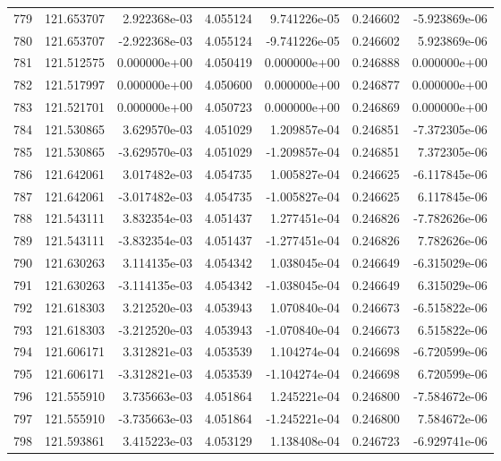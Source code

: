 \begin{tabular}{rrrrrrr}
 779 & 121.653707 &  2.922368e-03 &  4.055124 &  9.741226e-05 &   0.246602 & -5.923869e-06 \\
 780 & 121.653707 & -2.922368e-03 &  4.055124 & -9.741226e-05 &   0.246602 &  5.923869e-06 \\
 781 & 121.512575 &  0.000000e+00 &  4.050419 &  0.000000e+00 &   0.246888 &  0.000000e+00 \\
 782 & 121.517997 &  0.000000e+00 &  4.050600 &  0.000000e+00 &   0.246877 &  0.000000e+00 \\
 783 & 121.521701 &  0.000000e+00 &  4.050723 &  0.000000e+00 &   0.246869 &  0.000000e+00 \\
 784 & 121.530865 &  3.629570e-03 &  4.051029 &  1.209857e-04 &   0.246851 & -7.372305e-06 \\
 785 & 121.530865 & -3.629570e-03 &  4.051029 & -1.209857e-04 &   0.246851 &  7.372305e-06 \\
 786 & 121.642061 &  3.017482e-03 &  4.054735 &  1.005827e-04 &   0.246625 & -6.117845e-06 \\
 787 & 121.642061 & -3.017482e-03 &  4.054735 & -1.005827e-04 &   0.246625 &  6.117845e-06 \\
 788 & 121.543111 &  3.832354e-03 &  4.051437 &  1.277451e-04 &   0.246826 & -7.782626e-06 \\
 789 & 121.543111 & -3.832354e-03 &  4.051437 & -1.277451e-04 &   0.246826 &  7.782626e-06 \\
 790 & 121.630263 &  3.114135e-03 &  4.054342 &  1.038045e-04 &   0.246649 & -6.315029e-06 \\
 791 & 121.630263 & -3.114135e-03 &  4.054342 & -1.038045e-04 &   0.246649 &  6.315029e-06 \\
 792 & 121.618303 &  3.212520e-03 &  4.053943 &  1.070840e-04 &   0.246673 & -6.515822e-06 \\
 793 & 121.618303 & -3.212520e-03 &  4.053943 & -1.070840e-04 &   0.246673 &  6.515822e-06 \\
 794 & 121.606171 &  3.312821e-03 &  4.053539 &  1.104274e-04 &   0.246698 & -6.720599e-06 \\
 795 & 121.606171 & -3.312821e-03 &  4.053539 & -1.104274e-04 &   0.246698 &  6.720599e-06 \\
 796 & 121.555910 &  3.735663e-03 &  4.051864 &  1.245221e-04 &   0.246800 & -7.584672e-06 \\
 797 & 121.555910 & -3.735663e-03 &  4.051864 & -1.245221e-04 &   0.246800 &  7.584672e-06 \\
 798 & 121.593861 &  3.415223e-03 &  4.053129 &  1.138408e-04 &   0.246723 & -6.929741e-06 \\

\end{tabular}

